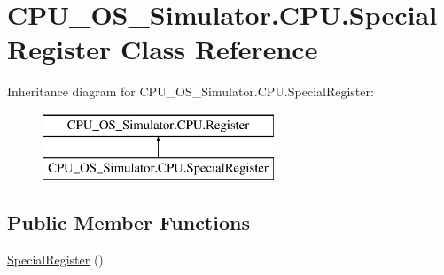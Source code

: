 \hypertarget{class_c_p_u___o_s___simulator_1_1_c_p_u_1_1_special_register}{}\section{C\+P\+U\+\_\+\+O\+S\+\_\+\+Simulator.\+C\+P\+U.\+Special\+Register Class Reference}
\label{class_c_p_u___o_s___simulator_1_1_c_p_u_1_1_special_register}
Inheritance diagram for C\+P\+U\+\_\+\+O\+S\+\_\+\+Simulator.\+C\+P\+U.\+Special\+Register\+:\begin{figure}[H]
\begin{center}
\leavevmode
\includegraphics[height=2.000000cm]{class_c_p_u___o_s___simulator_1_1_c_p_u_1_1_special_register}
\end{center}
\end{figure}
\subsection*{Public Member Functions}
\begin{DoxyCompactItemize}
\item 
\hyperlink{class_c_p_u___o_s___simulator_1_1_c_p_u_1_1_special_register_a697f3e6f938ad7ab0ceee0555fe2c312}{Special\+Register} ()
\end{DoxyCompactItemize}
